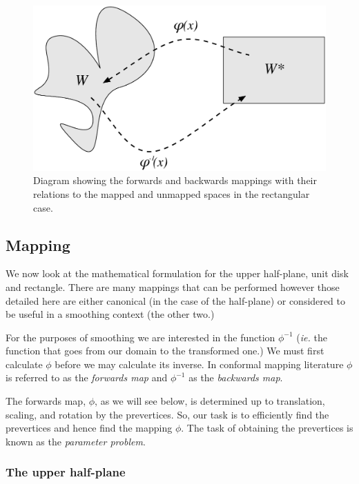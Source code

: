 \begin{figure} [tbp]
\centering
\includegraphics[scale=0.5]{sc/figs/mappingdia.pdf}
\caption{Diagram showing the forwards and backwards mappings with their relations to the mapped and unmapped spaces in the rectangular case.}
\label{mappingdia}
\end{figure}

\subsection{\sch Mapping}
\label{schparprob}
We now look at the mathematical formulation for the upper half-plane, unit disk and rectangle. There are many mappings that can be performed however those detailed here are either canonical (in the case of the half-plane) or considered to be useful in a smoothing context (the other two.)

For the purposes of smoothing we are interested in the function $\phi^{-1}$ (\emph{ie.} the function that goes from our domain to the transformed one.) We must first calculate $\phi$ before we may calculate its inverse. In conformal mapping literature $\phi$ is referred to as the \emph{forwards map} and $\phi^{-1}$ as the \emph{backwards map}.

The forwards map, $\phi$, as we will see below, is determined up to translation, scaling, and rotation by the prevertices. So, our task is to efficiently find the prevertices and hence find the mapping $\phi$. The task of obtaining the prevertices is known as the \emph{\sch parameter problem}.

\subsubsection{The upper half-plane}
\label{sc-parprob}

